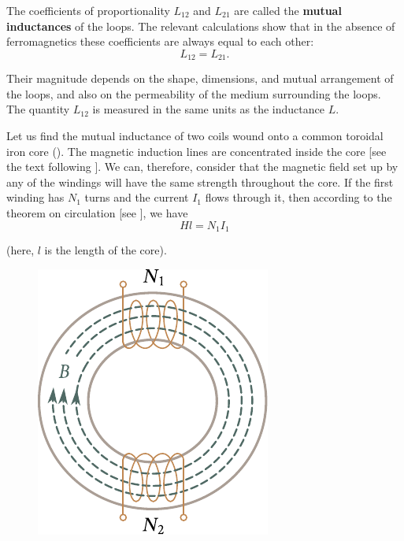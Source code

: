 The coefficients of proportionality $L_{12}$ and $L_{21}$ are called the \textbf{mutual inductances} of the loops.
The relevant calculations show that in the absence of ferromagnetics these coefficients are always equal to each other:
\begin{equation}\label{eq:8_30}
	L_{12} = L_{21}.
\end{equation}

\noindent
Their magnitude depends on the shape, dimensions,
and mutual arrangement of the loops, and also on the permeability of the medium surrounding the loops.
The quantity $L_{12}$ is measured in the same units as the inductance $L$.

Let us find the mutual inductance of two coils wound onto a common toroidal iron core ().
The magnetic induction lines are concentrated inside the core [see the text following ].
We can, therefore, consider that the magnetic field set up by any of the windings will have the same strength throughout the core.
If the first winding has $N_1$ turns and the current $I_1$ flows through it, then according to the theorem on circulation [see ], we have
\begin{equation}\label{eq:8_31}
	Hl = N_1 I_1
\end{equation}

\noindent
(here, $l$ is the length of the core).

\begin{figure}[t]
	\begin{center}
		\includegraphics[scale=1]{figures/ch_08/fig_8_10.pdf}
		\caption[]{}
		\label{fig:8_10}
	\end{center}
	\vspace{-0.8cm}
\end{figure}

